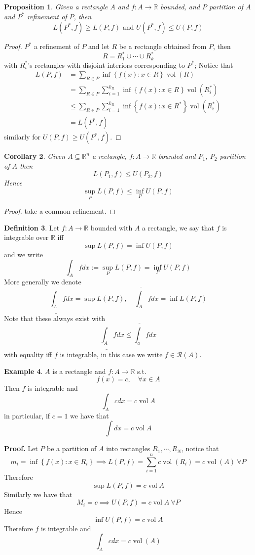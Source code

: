 \documentclass[11pt,a4paper]{article}
\theoremstyle{definition}
\newtheorem{definition}{Definition}[section]
\newtheorem{example}[definition]{Example}
\theoremstyle{plain}
\newtheorem{proposition}[definition]{Proposition}
\newtheorem{corollary}[definition]{Corollary}
\theoremstyle{remark}
\newcommand{\R}{\mathbb{R}}
\renewcommand{\set}[1]{\left\{ #1 \right\}}
\newcommand{\vol}{\operatorname{vol}}
\begin{document}
\begin{proposition}
    Given a rectangle $A$ and $f \colon A \to \R$ bounded, and $P$ partition of $A$ and $P^*$ refinement of $P$, then 
    $$L(P^*, f) \ge L(P, f) \text{ and } U(P^*, f) \le U(P, f)$$
\end{proposition}

\begin{proof}
    $P^*$ a refinement of $P$ and let $R$ be a rectangle obtained from $P$, then 
    $$R = R_1^* \cup \cdots \cup R_k^*$$
    with $R_i^*$'s rectangles with disjoint interiors corresponding to $P^*$; 
    Notice that 
    \begin{align*}
        L(P, f) &= \sum_{R \in P} \inf \set{f(x) \colon x \in R} \operatorname{vol} (R) \\
        &= \sum_{R \in P} \sum_{i=1}^{k_R} \inf \set{f(x) \colon x \in R} \operatorname{vol} (R_i^*) \\
        &\le \sum_{R \in P} \sum_{i=1}^{k_R} \inf \set{f(x) \colon x \in R^*} \operatorname{vol} (R_i^*) \\
        &= L(P^*, f)
    \end{align*}
    similarly for $U(P, f) \ge U(P^*, f)$. 
\end{proof}

\begin{corollary}
    Given $A \subseteq \R^n$ a rectangle, $f \colon A \to \R$ bounded and $P_1, \ P_2$ partition of $A$ then 
    $$L(P_1, f) \le U(P_2, f)$$
    Hence 
    $$\sup_P L(P, f) \le \inf_P U(P, f)$$
\end{corollary}

\begin{proof}
    take a common refinement.
\end{proof}

\begin{definition}
    Let $f \colon A \to \R$ bounded with $A$ a rectangle, we say that $f$ is integrable over $\R$ iff 
    $$\sup L(P, f) = \inf U(P, f)$$
    and we write 
    $$\int_{A} f dx := \sup_P L(P,f) = \inf_P U(P, f)$$
    More generally we denote 
    $$\underline{\int_A} f dx = \sup L(P, f), \quad \overline{\int_{A}} f dx = \inf L(P,f)$$
    Note that these always exist with 
    $$\underline{\int_A} f dx \le \overline{\int_a} f dx$$
    with equality iff $f$ is integrable, in this case we write $f \in \mathcal{R}(A)$.
\end{definition}

\begin{example}
    $A$ is a rectangle and $f \colon A \to \R$ s.t. 
    $$f(x) = c, \quad \forall x \in A$$
    Then $f$ is integrable and 
    $$\int_A c dx = c \vol A$$
    in particular, if $c = 1$ we have that 
    $$\int dx = c \vol A$$

    \textbf{Proof.} Let $P$ be a partition of $A$ into rectangles $R_1, \cdots, R_N$, notice that 
    $$m_i = \inf \set{f(x) \colon x \in R_i} \implies L(P,f) = \sum_{i=1}^n c \vol (R_i) = c \vol (A) \ \forall P$$
    Therefore 
    $$\sup L(P, f) = c \vol A$$
    Similarly we have that 
    $$M_i = c \implies U(P, f) = c \vol A \ \forall P$$
    Hence 
    $$\inf U(P, f) = c \vol A$$
    Therefore $f$ is integrable and 
    $$\int_A c dx = c \vol (A)$$
\end{example}
\end{document}
